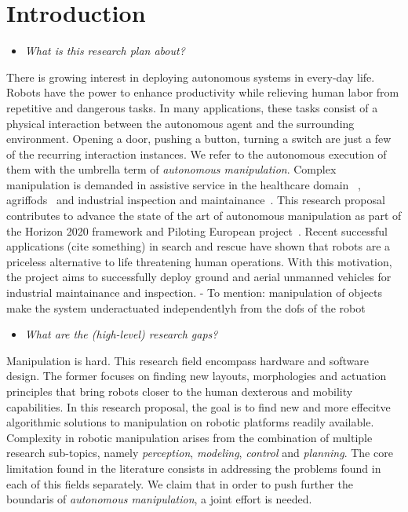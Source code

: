 \section{Introduction}
\label{sec:Introduction}


\begin{itemize}
	\item \emph{What is this research plan about?}
\end{itemize}

There is growing interest in deploying autonomous systems in every-day life. Robots have the power to enhance productivity while relieving human labor from repetitive and dangerous tasks. In many applications, these tasks consist of a physical interaction between the autonomous agent and the surrounding environment. Opening a door, pushing a button, turning a switch are just a few of the recurring interaction instances. We refer to the autonomous execution of them with the umbrella term of \emph{autonomous manipulation}. Complex manipulation is demanded in assistive service in the healthcare domain~\cite{cooper2020ari} , agriffods~\cite{duckett2018agricultural} and industrial inspection and maintainance~\cite{lattanzi2017review}. This research proposal contributes to advance the state of the art of autonomous manipulation as part of the Horizon 2020 framework and Piloting European project~\cite{eu-piloting-2020}. Recent successful applications (cite something) in search and rescue have shown that robots are a priceless alternative to life threatening human operations. With this motivation, the project aims to successfully deploy ground and aerial unmanned vehicles for industrial maintainance and inspection. 
- To mention: manipulation of objects make the system underactuated independentlyh from the dofs of the robot 
\begin{itemize}
    \item \emph{What are the (high-level) research gaps?}
\end{itemize}

Manipulation is hard. This research field encompass hardware and software design. The former focuses on finding new layouts, morphologies and actuation principles that bring robots closer to the human dexterous and mobility capabilities. In this research proposal, the goal is to find new and more effecitve algorithmic solutions to manipulation on robotic platforms readily available. Complexity in robotic manipulation arises from the combination of multiple research sub-topics, namely \emph{perception}, \emph{modeling}, \emph{control} and \emph{planning}. The core limitation found in the literature consists in addressing the problems found in each of this fields separately. We claim that in order to push further the boundaris of \emph{autonomous manipulation}, a joint effort is needed. 

